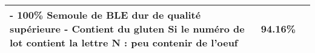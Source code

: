 \begin{longtable}{p{7cm}p{7cm}c}
                                                                                                                                                                                                                                                                                                                                                                                                                                                                                                                                                                                                                                                                                                                                                                                                                                                                                                                                              - 100\% Semoule de BLE dur de qualité supérieure \newline - Contient du gluten \newline Si le numéro de lot contient la lettre N : peu contenir de l'oeuf &   94.16\% \\ \hline

\end{longtable}
